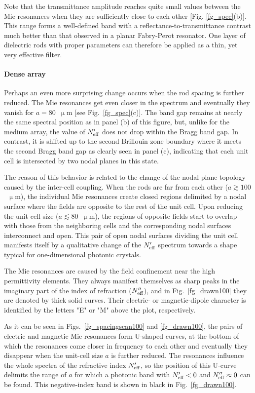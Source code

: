 {Note that the transmittance amplitude reaches quite small values between the Mie
resonances when they are sufficiently close to each other [Fig. \ref{fg_spec}(b)]. This range forms a
well-defined band with a reflectance-to-transmittance contrast much better than that
observed in a planar Fabry-Perot resonator. One layer of dielectric rods with proper
parameters can therefore be applied as a thin, yet very effective filter.

\paragraph{Dense array}
Perhaps an even more surprising change occurs when the rod spacing is further reduced. The Mie resonances get even closer in the
spectrum and eventually they vanish for $a=80$~$\upmu$m [see Fig.~\ref{fg_spec}(c)]. The band gap remains at nearly the same spectral
position as in panel (b) of this figure, but, unlike for the medium array, the value of $N_{\text{eff} }'$ does not drop within
the Bragg band gap. In contrast, it is shifted up to the second Brillouin zone boundary
where it meets the second Bragg band gap as clearly seen in panel (c), indicating that
each unit cell is intersected by two nodal planes in this state.

The reason of this behavior is related to the change of the nodal plane topology caused
by the inter-cell coupling. When the rods are far from each other ($a\gtrsim
100$~$\upmu$m), the individual Mie resonances create closed regions delimited by a nodal
surface where the fields are opposite to the rest of the unit cell. Upon reducing the
unit-cell size ($a\lesssim 80$~$\upmu$m), the regions of opposite fields start to overlap
with those from the neighboring cells and the corresponding nodal surfaces interconnect
and open. This pair of open nodal surfaces dividing the unit cell manifests itself by a
qualitative change of the $N_{\text{eff} }'$ spectrum towards a shape typical for one-dimensional
photonic crystals.


The Mie resonances are caused by the field confinement near the high permittivity
elements. They always manifest themselves as sharp peaks in the imaginary part of the
index of refraction ($N_{\text{eff} }''$), and in Fig.~\ref{fg_drawn100} they are denoted by thick
solid curves. Their electric- or magnetic-dipole character is identified by the letters
"E" or "M" above the plot, respectively.

As it can be seen in Figs.~\ref{fg_spacingscan100} and \ref{fg_drawn100}, the pairs
of electric and magnetic Mie resonances form U-shaped curves, at the bottom of which the
resonances come closer in frequency to each other and eventually they disappear when the
unit-cell size $a$ is further reduced. The resonances influence the whole spectra of the
refractive index $N_{\text{eff} }'$, so the position of this U-curve delimits the range of $a$ for
which a photonic band with $N_{\text{eff} }' < 0$ and $N_{\text{eff} }'' \approx 0$ can be found. This
negative-index band is shown in black in Fig.~\ref{fg_drawn100}.

}
